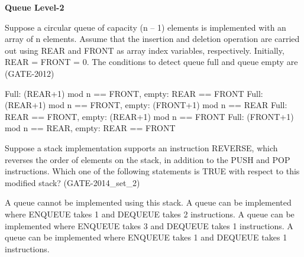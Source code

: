 
\centerline{\textbf{ \LARGE Queue Level-2}}

\begin{questyle}
  \question  Suppose a circular queue of capacity (n – 1) elements is implemented with an array of n elements.
            Assume that the insertion and deletion operation are carried out using REAR and FRONT as array index variables, respectively. Initially, REAR = FRONT = 0. The conditions to detect queue full and queue empty are  (GATE-2012)

  \begin{choices}
    \CorrectChoice  Full: (REAR+1) mod n == FRONT, empty: REAR == FRONT
    \choice         Full: (REAR+1) mod n == FRONT, empty: (FRONT+1) mod n == REAR
    \choice         Full: REAR == FRONT, empty: (REAR+1) mod n == FRONT
    \choice         Full: (FRONT+1) mod n == REAR, empty: REAR == FRONT
  \end{choices}
\end{questyle}

\begin{questyle}
  \question  Suppose a stack implementation supports an instruction REVERSE, which reverses the
            order of elements on the stack, in addition to the PUSH and POP instructions. Which
            one of the following statements is TRUE with respect to this modified stack?  (GATE-2014\_set\_2)

  \begin{choices}
    \choice         A queue cannot be implemented using this stack.
    \choice         A queue can be implemented where ENQUEUE takes 1 and DEQUEUE takes 2 instructions.
    \CorrectChoice  A queue can be implemented where ENQUEUE takes 3 and DEQUEUE takes 1 instructions.
    \choice         A queue can be implemented where ENQUEUE takes 1 and DEQUEUE takes 1 instructions.
  \end{choices}
\end{questyle}




